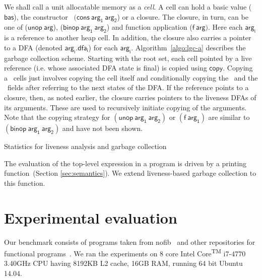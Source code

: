 \documentclass[9pt,preprint,letter,nonatbib]{sigplanconf}
\begin{document}
We shall call a  unit allocatable memory as a {\em  cell}.  A cell can
hold    a    basic    value    ($\mathsf{bas}$),    the    constructor
\CONS\ $(\mathsf{cons~  arg_1~arg_2}$) or a closure.   The closure, in
turn,    can    be    one   of    ($\mathsf{unop~arg}$),    ($\mathsf{
  binop~arg_1~arg_2}$)  and  function application  ($\mathsf{f~arg})$.
Here each $\mathsf{  arg_i}$ is a reference to another  heap cell.  In
addition, the closure also carries  a pointer to a DFA (denoted
$\mathsf{arg_i.dfa_i}$) for each $\mathsf{arg_i}$.
Algorithm~\ref{algo:lgc-a}   describes   the   garbage
collection scheme.  Starting with the root set, each cell pointed by a
live reference  (i.e. whose associated  DFA state is final)  is copied
using $\mathsf{copy}$.   Copying a \CONS\ cells  just involves copying
the  cell  itself   and  conditionally  copying  the   \CAR\  and  the
\CDR\ fields after referring to the  next states of the DFA.  If
the reference points to a closure, then, as noted earlier, the closure
carries pointers  to the liveness  DFAs of its  arguments.  These
are  used to recursively  initiate copying of  the arguments.
Note that  the copying  strategy for  $\mathsf{(unop~arg_1~arg_2)}$ or
$\mathsf{(f~arg_1)}$ are similar to $\mathsf{(binop~arg_1~arg_2)}$ and
have not been shown.



\begin{table*}[t!]
\caption{Statistics for liveness analysis and garbage collection}
\label{tab:exp-results}
\centering

\vskip -5mm

\vskip -7mm
\end{table*} 

The evaluation of  the top-level expression in a program  is driven by
a printing function~(Section
\ref{sec:semantics}).  
We extend liveness-based  garbage  collection  to
this function.
\section{Experimental evaluation}
\label{sec:experiments}
Our benchmark  consists of programs taken  from nofib~\cite{nofib} and
other repositories for functional programs~\cite{PLT-Scheme, gc_bench,
  huffman-sicp}.     We    ran    the   experiments    on    8    core
Intel\textsuperscript{\textregistered}        Core\textsuperscript{TM}
i7-4770 3.40GHz CPU  having 8192KB L2 cache, 16GB RAM,  running 64 bit
Ubuntu 14.04.
\end{document}
